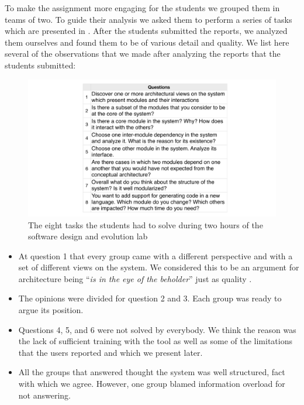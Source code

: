\documentclass[preprint,12pt]{elsarticle}
\begin{document}
To make the assignment more engaging for the students we grouped them in teams of two. To guide their analysis we asked them to perform a series of tasks which are presented in . After the students submitted the reports, we analyzed them ourselves and found them to be of various detail and quality. We list here several of the observations that we made after analyzing the reports that the students submitted:

\begin{figure}[t]
\begin{center}
\includegraphics[width=\linewidth]{tasks}
\caption{The eight tasks the students had to solve during two hours of the software design and evolution lab}
\end{center}
\end{figure}


\begin{itemize}
\item At question 1 that every group came with a different perspective and with a set of different views on the system. We considered this to be an argument for architecture being ``{\em is in the eye of the beholder}'' just as quality \cite{bass-architecture}.

\item The opinions were divided for question 2 and 3. Each group was ready to argue its position. 

\item Questions 4, 5, and 6 were not solved by everybody. We think the reason was the lack of sufficient training with the tool as well as some of the limitations that the users reported and which we present later.

\item All the groups that answered thought the system was well structured, fact with which we agree. However, one group blamed information overload for not answering. 

\end{itemize}
\end{document}
